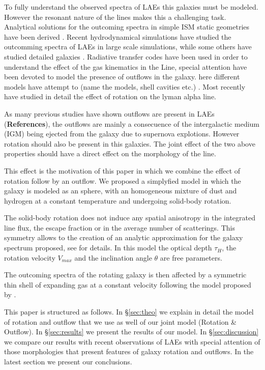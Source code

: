 \documentclass{latex/emulateapj}
\begin{document}
To fully understand the observed spectra of LAEs this galaxies must be
modeled. 
However the resonant nature of the lines makes this a challenging
task.  
Analytical solutions for the outcoming spectra in simple ISM static
geometries have been derived \cite{Adams72, Harrington73, Neufeld90,
  Dijkstra06}. Recent hydrodynamical simulations have studied the
outcomming spectra of LAEs in large scale simulations, while some
others have studied detailed galaxies \citep{Verhamme12}.  
Radiative transfer codes \citep{Laursen09, Verhamme06, CLARA}have been
used in order to understand the effect of the  gas kinematics in the
Line, special attention have been devoted to model the presence   of
outflows in the galaxy. here different models have attempt to (name
the models, shell cavities etc.) 
\citep{Behrens2014}. 
Most recently \cite{Garavito14} have studied in detail the effect 
of rotation on the lyman alpha line.

As many previous studies have shown outflows are present in LAEs
(\textbf{References}), the outflows are mainly a consecuence of the
intergalactic medium (IGM) being ejected  from the galaxy due to
supernova explotions. 
However rotation should also be present in this galaxies. The joint
effect of the two above properties should have a direct effect on the
morphology of the \lya line. 

This effect is the motivation of this paper in which we combine the
effect of rotation  follow by an outflow. We proposed a simplyfied
model in which the galaxy is modeled as an sphere, with an homogeneous
mixture of dust and hydrogen at a constant temperature and undergoing
solid-body rotation.   

The solid-body rotation does not induce any spatial anisotropy in the
integrated line flux,  the escape fraction or in the average number of
scatterings. This symmetry allows  to the creation of an analytic
approximation for the galaxy spectrum  proposed, see \cite{Garavito14}
for details. In this model the optical depth $\tau_{H}$, the  rotation
velocity $V_{max}$ and the inclination angle $\theta$ are free
parameters. 
 
The outcoming spectra of the rotating galaxy is then affected by a
symmetric thin shell of expanding gas at a constant velocity following
the model proposed by \cite{2014arXiv1404.2958V, Orsi12}.    

This paper is structured as follows. In \S \ref{sec:theo} we explain
in detail the model of rotation and outflow that we use as well of our
joint model (Rotation \& Outflow). In \S \ref{sec:results} we present
the results of our model. In \S \ref{sec:discussion} we compare our
results with  recent observations of LAEs with special attention of
those morphologies that present features of galaxy rotation and
outflows. In the latest section we present our  conclusions.  
\end{document}

